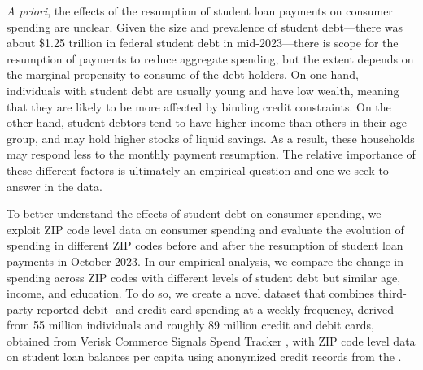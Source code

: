 \documentclass[12pt]{article}
\begin{document}
\emph{A priori}, the effects of the resumption of student loan payments on consumer spending are unclear. Given the size and prevalence of student debt---there was about \$1.25  trillion in federal student debt in mid-2023---there is scope for the resumption of payments to reduce aggregate spending, but the extent depends on the marginal propensity to consume of the debt holders.  On one hand, individuals with student debt are usually young and have low wealth, meaning that they are likely to be more affected by binding credit constraints. On the other hand, student debtors tend to have higher income than others in their age group, and may hold higher stocks of liquid savings. As a result, these households may respond less to the monthly payment resumption. The relative importance of these different factors is ultimately an empirical question and one we seek to answer in the data. %

To better understand the effects of student debt on consumer spending, we exploit ZIP code level data on consumer spending and evaluate the evolution of spending in different ZIP codes before and after the resumption of student loan payments in October 2023. %
In our empirical analysis, we compare the change in spending across ZIP codes with different levels of student debt but similar age, income, and education. 
To do so, we create a novel dataset that combines third-party reported debit- and credit-card spending at a weekly frequency, derived from 55 million individuals and roughly 89 million credit and debit cards, obtained from Verisk Commerce Signals Spend Tracker \citep{Verisk}, with ZIP code level data on student loan balances per capita using anonymized credit records from the \citet{NYFedEquifax}.
\end{document}
